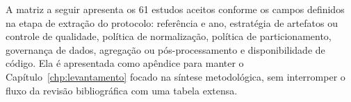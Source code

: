 A matriz a seguir apresenta os 61 estudos aceitos conforme os campos definidos
na etapa de extração do protocolo: referência e ano, estratégia de artefatos ou
controle de qualidade, política de normalização, política de particionamento,
governança de dados, agregação ou pós-processamento e disponibilidade de código.
Ela é apresentada como apêndice para manter o Capítulo~\ref{chp:levantamento}
focado na síntese metodológica, sem interromper o fluxo da revisão bibliográfica
com uma tabela extensa.


